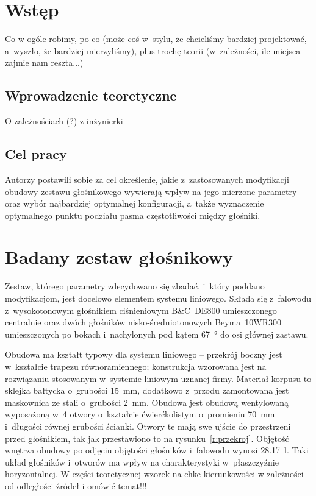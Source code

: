 \documentclass[12pt]{oska}
\affiliation{Akademia Górniczo-Hutnicza im. S. Staszica w Krakowie}
\begin{document}
\maketitles

\section{Wstęp}

	\color{orange} Co w ogóle robimy, po co (może coś w~stylu, że chcieliśmy bardziej projektować, a~wyszło, że bardziej mierzyliśmy), plus trochę teorii (w~zależności, ile miejsca zajmie nam reszta...)
	\color{black}
	
	\subsection{Wprowadzenie teoretyczne}
	
	\color{orange} O zależnościach (?) z inżynierki
	\color{black}
	
	\subsection{Cel pracy}
	
		Autorzy postawili sobie za cel określenie, jakie z~zastosowanych modyfikacji obudowy zestawu głośnikowego wywierają wpływ na jego mierzone parametry oraz wybór najbardziej optymalnej konfiguracji, a~także wyznaczenie optymalnego punktu podziału pasma częstotliwości między głośniki.

\section{Badany zestaw głośnikowy}
	
	Zestaw, którego parametry zdecydowano się zbadać, i~który poddano modyfikacjom, jest docelowo elementem systemu liniowego. Składa się z~falowodu z~wysokotonowym głośnikiem ciśnieniowym B\&C~DE800 umieszczonego centralnie oraz dwóch głośników nisko-średniotonowych Beyma~10WR300 umieszczonych po bokach i~nachylonych pod kątem \SI{67}{\degree} do osi głównej zastawu. 
	
Obudowa ma kształt typowy dla systemu liniowego -- przekrój boczny jest w~kształcie trapezu równoramiennego; konstrukcja wzorowana jest na rozwiązaniu stosowanym w~systemie liniowym uznanej firmy. Materiał korpusu to sklejka bałtycka o~grubości \SI{15}{\milli\metre}, dodatkowo z~przodu zamontowana jest maskownica ze stali o~grubości \SI{2}{\milli\metre}. Obudowa jest obudową wentylowaną wyposażoną w~4 otwory o~kształcie ćwierćkolistym o~promieniu \SI{70}{\milli\metre} i~długości równej grubości ścianki. Otwory te mają swe ujście do przestrzeni przed głośnikiem, tak jak przestawiono to na rysunku~\ref{r:przekroj}. %
Objętość wnętrza obudowy po odjęciu objętości głośników i~falowodu wynosi \SI{28,17}{\litre}. Taki układ głośników i~otworów ma wpływ na charakterystyki w~płaszczyźnie horyzontalnej. \color{orange}W części teoretycznej wzorek na chke kierunkowości w zależności od odległości źródeł i omówić temat!!!\color{black}
	
\end{document}
